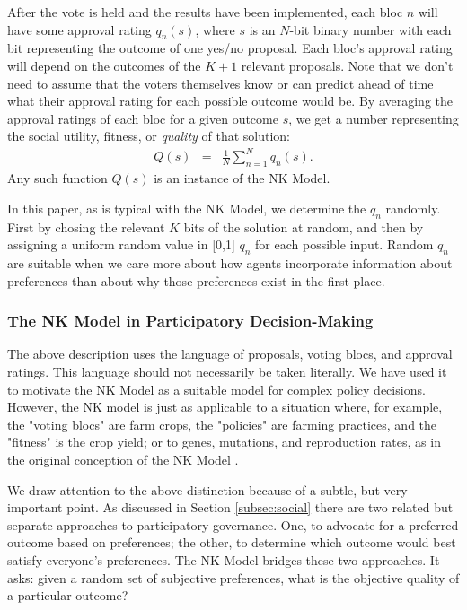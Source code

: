 \documentclass[manuscript,screen,review,acmsmall]{acmart}
\begin{document}
After the vote is held and the results have been implemented, each bloc $n$ will have some approval rating $q_n(s)$,
where $s$ is an $N$-bit binary number with each bit representing the outcome of one yes/no proposal.
Each bloc's approval rating will depend on the outcomes of the $K+1$ relevant proposals.
Note that we don't need to assume that the voters themselves know or can predict ahead of time what their approval rating for each possible outcome would be.
By averaging the approval ratings of each bloc for a given outcome $s$, we get a number representing the social utility, fitness, or {\em quality} of that solution:
\begin{eqnarray}
    Q(s) &=& \frac{1}{N}\sum_{n=1}^N q_n(s).
\end{eqnarray}
Any such function $Q(s)$ is an instance of the NK Model.

In this paper, as is typical with the NK Model, we determine the $q_n$ randomly.
First by chosing the relevant $K$ bits of the solution at random, and then by assigning a uniform random value in [0,1] $q_n$ for each possible input.
Random $q_n$ are suitable when we care more about how agents incorporate information about preferences than about why those preferences exist in the first place.

\subsubsection{The NK Model in Participatory Decision-Making}
The above description uses the language of proposals, voting blocs, and approval ratings. This language should not necessarily be taken literally.
We have used it to motivate the NK Model as a suitable model for complex policy decisions.
However, the NK model is just as applicable to a situation where, for example, the "voting blocs" are farm crops, the "policies" are farming practices, and the "fitness" is the crop yield; or to genes, mutations, and reproduction rates, as in the original conception of the NK Model \cite{kauffman_towards_1987}.

We draw attention to the above distinction because of a subtle, but very important point.
As discussed in Section \ref{subsec:social} there are two related but separate approaches to participatory governance.
One, to advocate for a preferred outcome based on preferences;
the other, to determine which outcome would best satisfy everyone's preferences.
The NK Model bridges these two approaches.
It asks: given a random set of subjective preferences,
what is the objective quality of a particular outcome?
\end{document}
